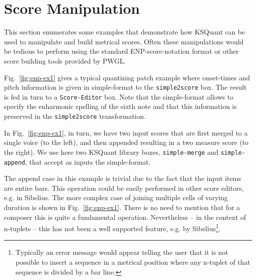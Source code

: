 \documentclass[runningheads,a4paper]{llncs}
\begin{document}


\section{Score Manipulation}\label{Score Manipulation}
This section enumerates some examples that demonstrate how KSQuant
can be used to manipulate and build metrical scores. Often these
manipulations would be tedious to perform using the standard
ENP-score-notation format or other score building tools provided by
PWGL.

Fig.~\ref{fig:enp-ex1} gives a typical quantizing patch example where
onset-times and pitch information is given in simple-format to the
\texttt{simple2score} box. The result is fed in turn to a
\texttt{Score-Editor} box. Note that the simple-format allows to
specify the enharmonic spelling of the sixth note and that this
information is preserved in the \texttt{simple2score} transformation.


In Fig.~\ref{fig:enp-ex1}, in turn, we have two input scores that are first merged to
a single voice (to the left), and then appended resulting in a two
measure score (to the right). We use here two KSQuant library boxes,
\texttt{simple-merge} and \texttt{simple-append}, that accept as
inputs the simple-format.

The append case in this example is trivial due to the fact that the
input items are entire bars. This operation could be easily performed
in other score editors, e.g. in Sibelius\cite{agon}. The more
complex case of joining multiple cells of varying duration is shown in
Fig.~\ref{fig:enp-ex1}. There is no need to mention that for a composer
this is quite a fundamental operation. Nevertheless -- in the context
of n-tuplets -- this has not been a well supported feature, e.g. by
Sibelius\footnote{Typically an error message would appear telling the
  user that it is not possible to insert a sequence in a metrical
  position where any n-tuplet of that sequence is divided by a
  bar line.}.
\end{document}
